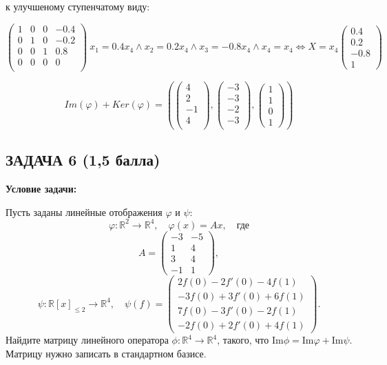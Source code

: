 \documentclass[a4paper,12pt]{article}
\begin{document}
к улучшеному ступенчатому виду:

\[
\begin{pmatrix}
    1 & 0 & 0& -0.4 \\
    0 & 1 & 0& -0.2 \\
    0 & 0 & 1& 0.8 \\
    0 & 0 & 0 & 0  \\
\end{pmatrix}\
x_1 = 0.4x_4 \land x_2 = 0.2x_4 \land x_3 = -0.8 x_4 \land x_4 = x_4 \Longleftrightarrow
X = x_4\begin{pmatrix}
    0.4 \\
    0.2 \\
    -0.8 \\
    1
\end{pmatrix}
\]

\[
Im(\varphi) + Ker(\varphi) = \left(\begin{pmatrix}
    4\\
    2\\
    -1\\
    4\\
\end{pmatrix}, \begin{pmatrix}
    -3 \\
    -3 \\
    -2 \\
    -3 \\
\end{pmatrix},\begin{pmatrix}
        1 \\ 1 \\ 0 \\ 1
    \end{pmatrix} \right)
\]


\vspace{1cm}

\subsection{ЗАДАЧА 6 \hfill \textbf{(1,5 балла)}}
\textbf{Условие задачи:}

Пусть заданы линейные отображения \( \varphi \) и \( \psi \):
\[
\varphi: \mathbb{R}^2 \to \mathbb{R}^4, \quad \varphi(x) = Ax, \quad \text{где}
\]
\[
A =
\begin{pmatrix}
-3 & -5 \\
1 & 4 \\
3 & 4 \\
-1 & 1
\end{pmatrix},
\]
\[
\psi: \mathbb{R}[x]_{\leq 2} \to \mathbb{R}^4, \quad \psi(f) =
\begin{pmatrix}
2f(0) - 2f'(0) - 4f(1) \\
-3f(0) + 3f'(0) + 6f(1) \\
7f(0) - 3f'(0) - 2f(1) \\
-2f(0) + 2f'(0) + 4f(1)
\end{pmatrix}.
\]
Найдите матрицу линейного оператора \( \phi: \mathbb{R}^4 \to \mathbb{R}^4 \), такого, что \( \text{Im} \phi = \text{Im} \varphi + \text{Im} \psi \). Матрицу нужно записать в стандартном базисе.
\end{document}
